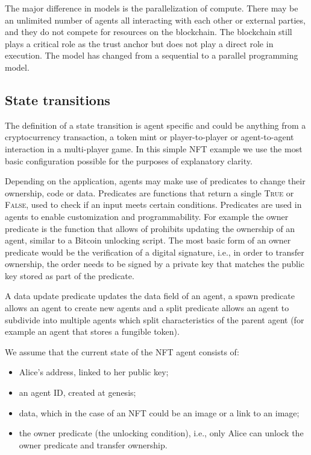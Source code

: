 \documentclass{article}
\begin{document}
The major difference in models is the parallelization of compute. There may be an unlimited number of agents all interacting with each other or external parties, and they do not compete for resources on the blockchain. The blockchain still plays a critical role as the trust anchor but does not play a direct role in execution. The model has changed from a sequential to a parallel programming model.

\subsection{State transitions}

The definition of a state transition is agent specific and could be anything from a cryptocurrency transaction, a token mint or player-to-player or agent-to-agent interaction in a multi-player game. In this simple NFT example we use the most basic configuration possible for the purposes of explanatory clarity.

Depending on the application, agents may make use of predicates to change their ownership, code or data. Predicates are functions that return a single \textsc{True} or \textsc{False}, used to check if an input meets certain conditions. Predicates are used in agents to enable customization and programmability. For example the owner predicate is the function that allows of prohibits updating the ownership of an agent, similar to a Bitcoin unlocking script. The most basic form of an owner predicate would be the verification of a digital signature, i.e., in order to transfer ownership, the order needs to be signed by a private key that matches the public key stored as part of the predicate.

A data update predicate updates the data field of an agent, a spawn predicate allows an agent to create new agents and a split predicate allows an agent to subdivide into multiple agents which split characteristics of the parent agent (for example an agent that stores a fungible token).

We assume that the current state of the NFT agent consists of:

\begin{itemize}
    \item Alice's address, linked to her public key;
    \item an agent ID, created at genesis;
    \item data, which in the case of an NFT could be an image or a link to an image;
    \item the owner predicate (the unlocking condition), i.e., only Alice can unlock the owner predicate and transfer ownership.
\end{itemize}
\end{document}
